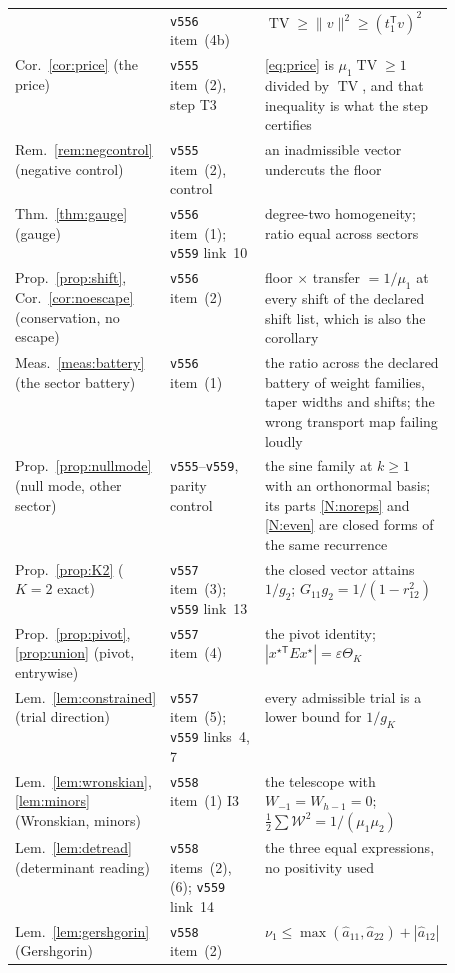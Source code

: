 \documentclass[11pt,a4paper]{article}
\theoremstyle{plain}
\theoremstyle{definition}
\newcommand{\T}{\mathsf{T}}
\newcommand{\ah}{\widehat{a}}
\newcommand{\TV}{\operatorname{TV}}
\begin{document}
{\begin{xltabular}{\textwidth}{@{}p{0.27\linewidth}p{0.24\linewidth}Y@{}}
  & \texttt{v556} item~(4b)
  & $\TV\ge\lVert v\rVert^{2}\ge(t_1^{\T}v)^{2}$ \\
Cor.~\ref{cor:price} (the price)
  & \texttt{v555} item~(2), step T3
  & \eqref{eq:price} is $\mu_1\TV\ge1$ divided by $\TV$, and that inequality is
    what the step certifies \\
Rem.~\ref{rem:negcontrol} (negative control)
  & \texttt{v555} item~(2), control
  & an inadmissible vector undercuts the floor \\
Thm.~\ref{thm:gauge} (gauge)
  & \texttt{v556} item~(1); \texttt{v559} link~10
  & degree-two homogeneity; ratio equal across sectors \\
Prop.~\ref{prop:shift}, Cor.~\ref{cor:noescape} (conservation, no escape)
  & \texttt{v556} item~(2)
  & floor $\times$ transfer $=1/\mu_1$ at every shift of the declared shift
    list, which is also the corollary \\
Meas.~\ref{meas:battery} (the sector battery)
  & \texttt{v556} item~(1)
  & the ratio across the declared battery of weight families, taper widths and
    shifts; the wrong transport map failing loudly \\
Prop.~\ref{prop:nullmode} (null mode, other sector)
  & \texttt{v555}--\texttt{v559}, parity control
  & the sine family at $k\ge1$ with an orthonormal basis; its parts
    \ref{N:noreps} and \ref{N:even} are closed forms of the same recurrence \\
Prop.~\ref{prop:K2} ($K=2$ exact)
  & \texttt{v557} item~(3); \texttt{v559} link~13
  & the closed vector attains $1/g_2$; $G_{11}g_2=1/(1-r_{12}^{2})$ \\
Prop.~\ref{prop:pivot}, \ref{prop:union} (pivot, entrywise)
  & \texttt{v557} item~(4)
  & the pivot identity; $|x^{\star\T}Ex^{\star}|=\varepsilon\Theta_K$ \\
Lem.~\ref{lem:constrained} (trial direction)
  & \texttt{v557} item~(5); \texttt{v559} links~4, 7
  & every admissible trial is a lower bound for $1/g_K$ \\
Lem.~\ref{lem:wronskian}, \ref{lem:minors} (Wronskian, minors)
  & \texttt{v558} item~(1) I3
  & the telescope with $W_{-1}=W_{h-1}=0$;
    $\tfrac12\sum\mathcal W^{2}=1/(\mu_1\mu_2)$ \\
Lem.~\ref{lem:detread} (determinant reading)
  & \texttt{v558} items~(2), (6); \texttt{v559} link~14
  & the three equal expressions, no positivity used \\
Lem.~\ref{lem:gershgorin} (Gershgorin)
  & \texttt{v558} item~(2)
  & $\nu_1\le\max(\ah_{11},\ah_{22})+|\ah_{12}|$ \\

\end{xltabular}}
\end{document}
